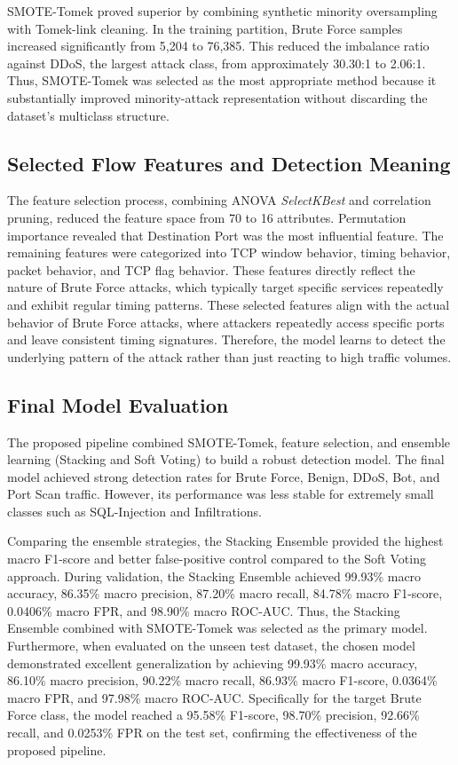 \documentclass[conference,a4paper]{IEEEtran}
\begin{document}
SMOTE-Tomek proved superior by combining synthetic minority oversampling with Tomek-link cleaning. In the training partition, Brute Force samples increased significantly from 5,204 to 76,385. This reduced the imbalance ratio against DDoS, the largest attack class, from approximately 30.30:1 to 2.06:1. Thus, SMOTE-Tomek was selected as the most appropriate method because it substantially improved minority-attack representation without discarding the dataset's multiclass structure.

\subsection{Selected Flow Features and Detection Meaning}

The feature selection process, combining ANOVA \textit{SelectKBest} and correlation pruning, reduced the feature space from 70 to 16 attributes. Permutation importance revealed that Destination Port was the most influential feature. The remaining features were categorized into TCP window behavior, timing behavior, packet behavior, and TCP flag behavior. These features directly reflect the nature of Brute Force attacks, which typically target specific services repeatedly and exhibit regular timing patterns. These selected features align with the actual behavior of Brute Force attacks, where attackers repeatedly access specific ports and leave consistent timing signatures. Therefore, the model learns to detect the underlying pattern of the attack rather than just reacting to high traffic volumes.

\subsection{Final Model Evaluation}

The proposed pipeline combined SMOTE-Tomek, feature selection, and ensemble learning (Stacking and Soft Voting) to build a robust detection model. The final model achieved strong detection rates for Brute Force, Benign, DDoS, Bot, and Port Scan traffic. However, its performance was less stable for extremely small classes such as SQL-Injection and Infiltrations. 

Comparing the ensemble strategies, the Stacking Ensemble provided the highest macro F1-score and better false-positive control compared to the Soft Voting approach. During validation, the Stacking Ensemble achieved 99.93\% macro accuracy, 86.35\% macro precision, 87.20\% macro recall, 84.78\% macro F1-score, 0.0406\% macro FPR, and 98.90\% macro ROC-AUC. Thus, the Stacking Ensemble combined with SMOTE-Tomek was selected as the primary model. Furthermore, when evaluated on the unseen test dataset, the chosen model demonstrated excellent generalization by achieving 99.93\% macro accuracy, 86.10\% macro precision, 90.22\% macro recall, 86.93\% macro F1-score, 0.0364\% macro FPR, and 97.98\% macro ROC-AUC. Specifically for the target Brute Force class, the model reached a 95.58\% F1-score, 98.70\% precision, 92.66\% recall, and 0.0253\% FPR on the test set, confirming the effectiveness of the proposed pipeline.
\end{document}
